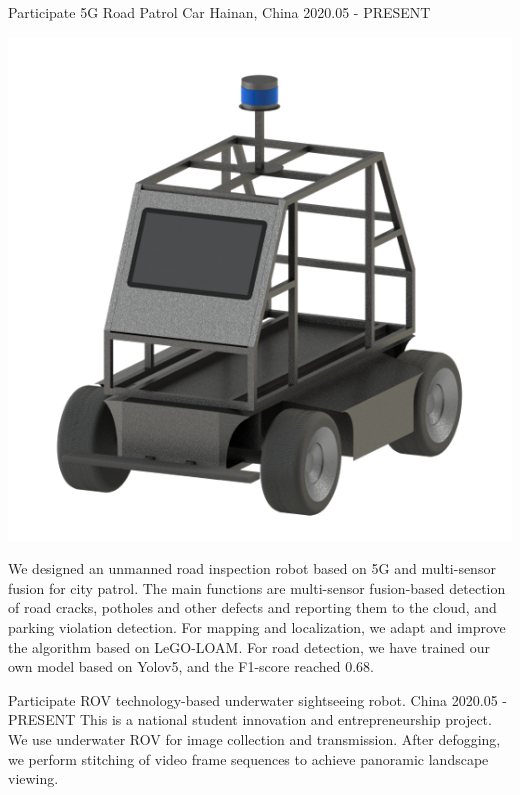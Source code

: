 \begin{cventries}
	\cventry
	{Participate} %
	{5G Road Patrol Car} %
	{Hainan, China} %
	{2020.05 - PRESENT} %
	{
		\begin{minipage}[b]{0.25\linewidth}
			\includegraphics[height=8\baselineskip]{figure/car.png}
		\end{minipage}
		\hfill
		\begin{minipage}[b]{0.7\linewidth}
			We designed an unmanned road inspection robot based on 5G and multi-sensor fusion for city patrol. The main functions are multi-sensor fusion-based detection of road cracks, potholes and other defects and reporting them to the cloud, and parking violation detection. For mapping and localization, we adapt and improve the algorithm based on LeGO-LOAM. For road detection, we have trained our own model based on Yolov5, and the F1-score reached 0.68.
		\end{minipage}
	}

  \cventry
    {Participate} %
    {ROV technology-based underwater sightseeing robot.} %
    {China} %
    {2020.05 - PRESENT} %
    {
      This is a national student innovation and entrepreneurship project. We use underwater ROV for image collection and transmission. After defogging, we perform stitching of video frame sequences to achieve panoramic landscape viewing.
    }


\end{cventries}
